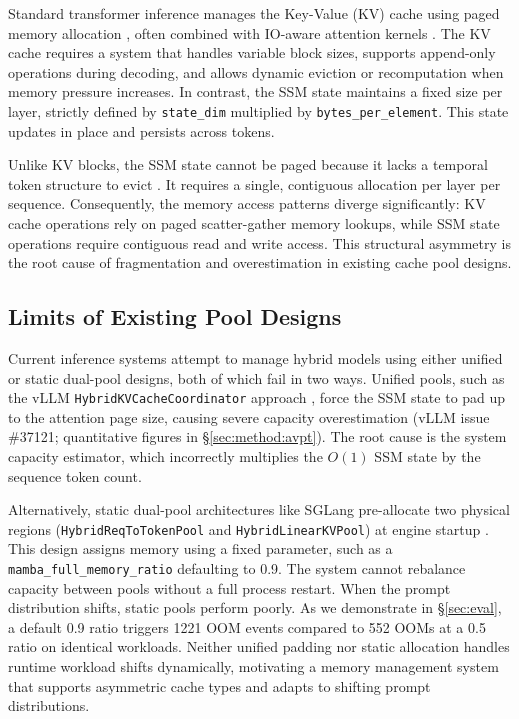 Standard transformer inference manages the Key-Value (KV) cache using paged memory allocation \cite{kwon2023pagedattention}, often combined with IO-aware attention kernels \cite{dao2022flashattention, shah2024flashattention3}. The KV cache requires a system that handles variable block sizes, supports append-only operations during decoding, and allows dynamic eviction or recomputation when memory pressure increases. In contrast, the SSM state maintains a fixed size per layer, strictly defined by \texttt{state\_dim} multiplied by \texttt{bytes\_per\_element}. This state updates in place and persists across tokens.

Unlike KV blocks, the SSM state cannot be paged because it lacks a temporal token structure to evict \cite{dao2024mamba2}. It requires a single, contiguous allocation per layer per sequence. Consequently, the memory access patterns diverge significantly: KV cache operations rely on paged scatter-gather memory lookups, while SSM state operations require contiguous read and write access. This structural asymmetry is the root cause of fragmentation and overestimation in existing cache pool designs.

\subsection{Limits of Existing Pool Designs}
\label{sec:background:pool}

Current inference systems attempt to manage hybrid models using either unified or static dual-pool designs, both of which fail in two ways. Unified pools, such as the vLLM \texttt{HybridKVCacheCoordinator} approach \cite{kwon2023pagedattention}, force the SSM state to pad up to the attention page size, causing severe capacity overestimation (vLLM issue \#37121; quantitative figures in \S\ref{sec:method:avpt}). The root cause is the system capacity estimator, which incorrectly multiplies the $O(1)$ SSM state by the sequence token count.

Alternatively, static dual-pool architectures like SGLang pre-allocate two physical regions (\texttt{HybridReqToTokenPool} and \texttt{HybridLinearKVPool}) at engine startup \cite{zheng2024sglang}. This design assigns memory using a fixed parameter, such as a \texttt{mamba\_full\_memory\_ratio} defaulting to 0.9. The system cannot rebalance capacity between pools without a full process restart. When the prompt distribution shifts, static pools perform poorly. As we demonstrate in \S\ref{sec:eval}, a default 0.9 ratio triggers 1221 OOM events compared to 552 OOMs at a 0.5 ratio on identical workloads. Neither unified padding nor static allocation handles runtime workload shifts dynamically, motivating a memory management system that supports asymmetric cache types and adapts to shifting prompt distributions.

